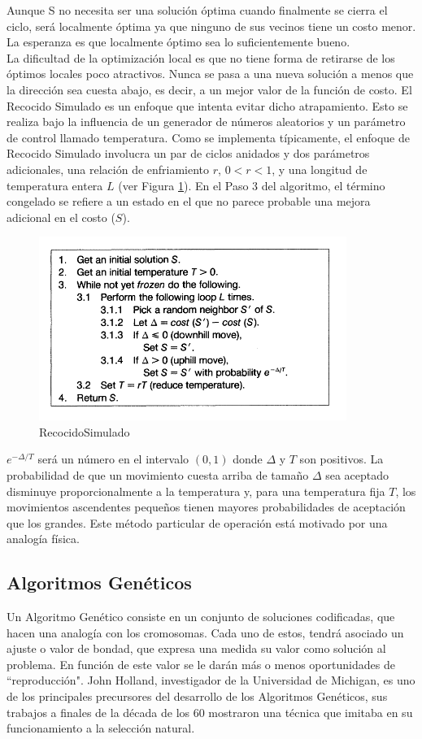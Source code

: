 \documentclass[a4paper,12pt]{book}
\begin{document}
		Aunque S no necesita ser una solución óptima cuando finalmente se cierra el ciclo, será localmente óptima ya que ninguno de sus vecinos tiene un costo menor. La esperanza es que localmente óptimo sea lo suficientemente bueno. \\
		
		La dificultad de la optimización local es que no tiene forma de retirarse de los óptimos locales poco atractivos. Nunca se pasa a una nueva solución a menos que la dirección sea cuesta abajo, es decir, a un mejor valor de la función de costo. El Recocido Simulado es un enfoque que intenta evitar dicho atrapamiento. Esto se realiza bajo la influencia de un generador de números aleatorios y un parámetro de control llamado temperatura. Como se implementa típicamente, el enfoque de Recocido Simulado involucra un par de ciclos anidados y dos parámetros adicionales, una relación de enfriamiento $r$, $0 < r <1$, y una longitud de temperatura entera $L$ (ver Figura \ref{RecocidoSimulado}). En el Paso 3 del algoritmo, el término congelado se refiere a un estado en el que no parece probable una mejora adicional en el costo ($S$).
		
		\begin{figure}[h]
		\centering
		\includegraphics[width=10cm]{./Graphics/RecocidoSimulado.png}
		\caption{RecocidoSimulado}
		\label{RecocidoSimulado}
		\end{figure}
		
		$e ^{-\Delta / T}$ será un número en el intervalo $(0, 1)$ donde $\Delta$ y $T$ son positivos. La probabilidad de que un movimiento cuesta arriba de tamaño $\Delta$ sea aceptado disminuye proporcionalmente a la temperatura y, para una temperatura fija $T$, los movimientos ascendentes pequeños tienen mayores probabilidades de aceptación que los grandes. Este método particular de operación está motivado por una analogía física.
		
	\subsection{Algoritmos Genéticos}
		Un Algoritmo Genético \cite{AlgGen} consiste en un conjunto de soluciones codificadas, que hacen una analogía con los cromosomas.  Cada  uno  de  estos, tendrá  asociado  un  ajuste o valor de bondad, que expresa una medida su valor como solución al problema. En función de este valor se le darán más o menos oportunidades de ``reproducción". John Holland, investigador de la Universidad de Michigan, es uno de los principales precursores del desarrollo de los Algoritmos Genéticos, sus trabajos a finales de la década de los 60 mostraron una técnica que imitaba en su funcionamiento a la selección natural.
		
\end{document}
